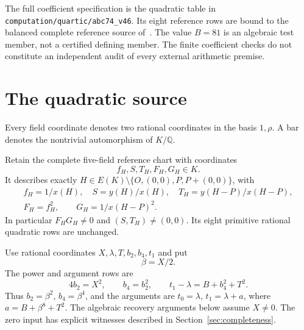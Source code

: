 \documentclass[11pt,a4paper]{article}
\newcommand{\Q}{\mathbb Q}\newcommand{\Z}{\mathbb Z}
\begin{document}
The full coefficient specification is the quadratic table in
\nolinkurl{computation/quartic/abc74_v46}. Its eight reference rows
are bound to the balanced complete reference source of~\cite{Parent}.
The value $B=81$ is an algebraic test member, not a certified defining
member. The finite coefficient checks do not constitute an independent
audit of every external arithmetic premise.

\section{The quadratic source}
Every field coordinate denotes two rational coordinates in the basis
$1,\rho$. A bar denotes the nontrivial automorphism of $K/\Q$.

Retain the complete five-field reference chart with coordinates
\[
                   f_H,S,T_H,F_H,G_H\in K.
\]
It describes exactly $H\in E(K)\setminus\{O,(0,0),P,P+(0,0)\}$,
with
\[
 \begin{gathered}
 f_H=1/x(H),\quad S=y(H)/x(H),\quad T_H=y(H-P)/x(H-P),\\
 F_H=f_H^2,\qquad G_H=1/x(H-P)^2.
 \end{gathered}
\]
In particular $F_HG_H\ne0$ and $(S,T_H)\ne(0,0)$.
Its eight primitive rational quadratic rows are unchanged.

Use rational coordinates $X,\lambda,T,b_2,b_4,t_1$ and put
\[
                              \beta=X/2.
\]
The power and argument rows are
\begin{equation}\label{eq:powers}
 4b_2=X^2,\qquad b_4=b_2^2,\qquad
 t_1-\lambda=B+b_4^2+T^2.
\end{equation}
Thus $b_2=\beta^2$, $b_4=\beta^4$, and the arguments are
$t_0=\lambda$, $t_1=\lambda+a$, where $a=B+\beta^8+T^2$.
The algebraic recovery arguments below assume $X\ne0$.
The zero input has explicit witnesses described in
Section~\ref{sec:completeness}.
\end{document}
